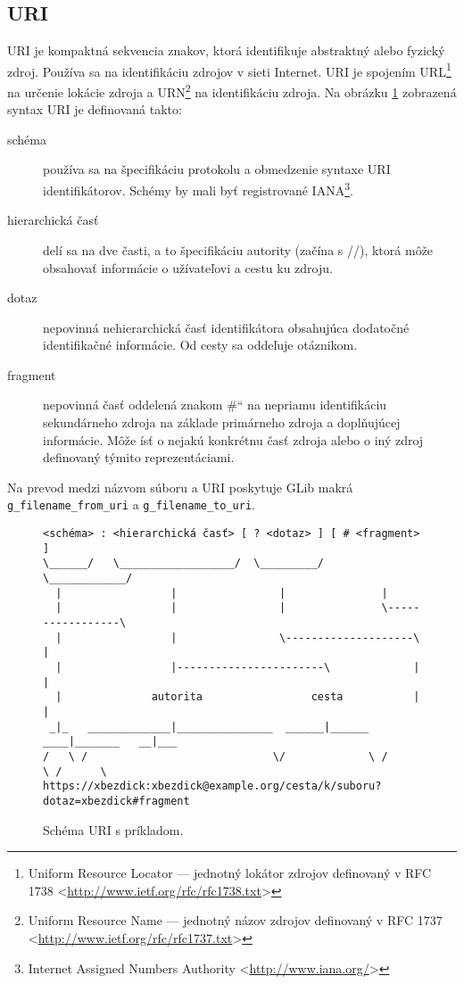 \documentclass[12pt,oneside,final]{fithesis2}
\newcommand\uv[1]{\quotedblbase #1\textquotedblleft}%
\begin{document}
\subsection{URI} 
URI je kompaktná sekvencia znakov, ktorá identifikuje abstraktný alebo fyzický zdroj. Používa sa na identifikáciu zdrojov v sieti Internet. URI je spojením URL\footnote{Uniform Resource Locator --- jednotný lokátor zdrojov definovaný v RFC 1738 <\url{http://www.ietf.org/rfc/rfc1738.txt}>} na určenie lokácie zdroja a URN\footnote{Uniform Resource Name --- jednotný názov zdrojov definovaný v RFC 1737 <\url{http://www.ietf.org/rfc/rfc1737.txt}>} na identifikáciu zdroja. Na obrázku \ref{obr.URI} zobrazená syntax URI je definovaná takto:
\begin{description}
\item[schéma] používa sa na špecifikáciu protokolu a obmedzenie syntaxe URI identifikátorov. Schémy by mali byť registrované IANA\footnote{Internet Assigned Numbers Authority <\url{http://www.iana.org/}>}.
\item[hierarchická časť] delí sa na dve časti, a to špecifikáciu autority (začína s //), ktorá môže obsahovať informácie o užívateľovi a cestu ku zdroju.
\item[dotaz] nepovinná nehierarchická časť identifikátora obsahujúca dodatočné identifikačné informácie. Od cesty sa oddeľuje otáznikom.%
\item[fragment] nepovinná časť oddelená znakom \uv{\#} na nepriamu identifikáciu sekundárneho zdroja na základe primárneho zdroja a doplňujúcej informácie. Môže ísť o nejakú konkrétnu časť zdroja alebo o iný zdroj definovaný týmito reprezentáciami.
\end{description}
Na prevod medzi názvom súboru a URI poskytuje GLib makrá \\
\verb|g_filename_from_uri| a \verb|g_filename_to_uri|.

\begin{figure}[h]
\begin{tiny}
\begin{verbatim}
<schéma> : <hierarchická časť> [ ? <dotaz> ] [ # <fragment> ] 
\______/   \__________________/  \_________/   \____________/
  |	                |                |               |
  |	                |                |               \-----------------\
  |                 |                \--------------------\	           |
  |	                |-----------------------\             |	           |
  |	             autorita                 cesta	          |	           |
 _|_   _____________|_______________  ______|______   ____|_______   __|___
/   \ /                             \/             \ /            \ /      \
https://xbezdick:xbezdick@example.org/cesta/k/suboru?dotaz=xbezdick#fragment
\end{verbatim}
\end{tiny}
\caption{Schéma URI s príkladom.}
\label{obr.URI}
\end{figure}
\end{document}
